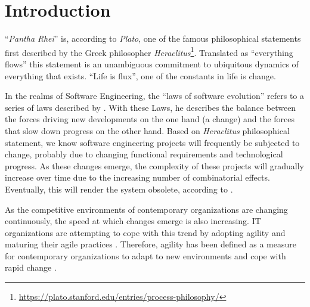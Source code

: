 \chapter{Introduction} \label{introduction}

\enquote{\emph{Pantha Rhei}} is, according to \emph{Plato}, one of the famous
philosophical statements first described by the Greek philosopher
\emph{Heraclitus}\footnote{\url{https://plato.stanford.edu/entries/process-philosophy/}}.
Translated as \enquote{everything flows} this statement is an unambiguous commitment to
ubiquitous dynamics of everything that exists. \enquote{Life is flux}, one of the
constants in life is change.

In the realms of Software Engineering, the \enquote{laws of software evolution}
\parencite[]{lehman_programs_1980} refers to a series of laws described by
\citeauthor{lehman_programs_1980}. With these Laws, he describes the balance between the
forces driving new developments on the one hand (a change) and the forces that slow down
progress on the other hand. Based on \emph{Heraclitus} philosophical statement, we know
software engineering projects will frequently be subjected to change, probably due to
changing functional requirements and technological progress. As these changes emerge, the
complexity of these projects will gradually increase over time due to the increasing
number of combinatorial effects. Eventually, this will render the system obsolete,
according to \citeauthor{lehman_programs_1980} \parencite[]{lehman_programs_1980}.

As the competitive environments of contemporary organizations are changing continuously,
the speed at which changes emerge is also increasing. IT organizations are
attempting to cope with this trend by adopting agility and maturing their agile practices
\parencite[]{2024_SIM_key_issues_and_trends}. Therefore, agility has been defined as a measure for
contemporary organizations to adapt to new environments and cope with rapid change
\parencite[]{neumann_strategic_1994}.







